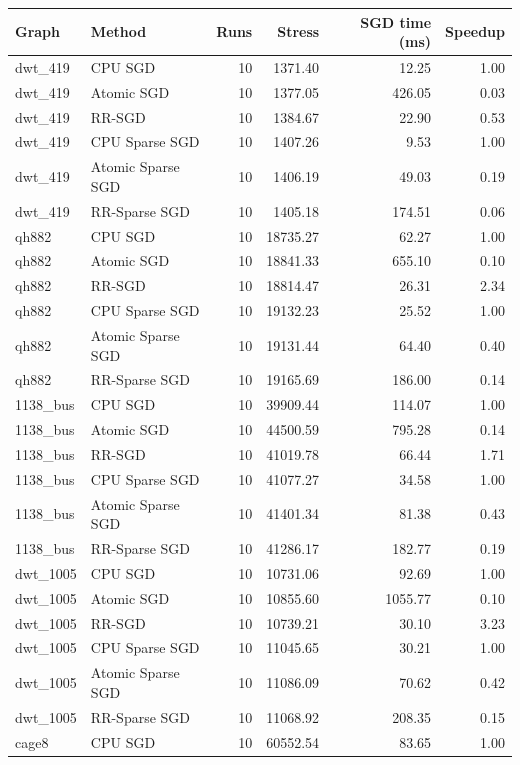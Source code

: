 \begin{tabular}{llrrrr}
\hline
Graph & Method & Runs & Stress & SGD time (ms) & Speedup \\
\hline
dwt\_419 & CPU SGD & 10 & 1371.40 & 12.25 & 1.00 \\
dwt\_419 & Atomic SGD & 10 & 1377.05 & 426.05 & 0.03 \\
dwt\_419 & RR-SGD & 10 & 1384.67 & 22.90 & 0.53 \\
dwt\_419 & CPU Sparse SGD & 10 & 1407.26 & 9.53 & 1.00 \\
dwt\_419 & Atomic Sparse SGD & 10 & 1406.19 & 49.03 & 0.19 \\
dwt\_419 & RR-Sparse SGD & 10 & 1405.18 & 174.51 & 0.06 \\
qh882 & CPU SGD & 10 & 18735.27 & 62.27 & 1.00 \\
qh882 & Atomic SGD & 10 & 18841.33 & 655.10 & 0.10 \\
qh882 & RR-SGD & 10 & 18814.47 & 26.31 & 2.34 \\
qh882 & CPU Sparse SGD & 10 & 19132.23 & 25.52 & 1.00 \\
qh882 & Atomic Sparse SGD & 10 & 19131.44 & 64.40 & 0.40 \\
qh882 & RR-Sparse SGD & 10 & 19165.69 & 186.00 & 0.14 \\
1138\_bus & CPU SGD & 10 & 39909.44 & 114.07 & 1.00 \\
1138\_bus & Atomic SGD & 10 & 44500.59 & 795.28 & 0.14 \\
1138\_bus & RR-SGD & 10 & 41019.78 & 66.44 & 1.71 \\
1138\_bus & CPU Sparse SGD & 10 & 41077.27 & 34.58 & 1.00 \\
1138\_bus & Atomic Sparse SGD & 10 & 41401.34 & 81.38 & 0.43 \\
1138\_bus & RR-Sparse SGD & 10 & 41286.17 & 182.77 & 0.19 \\
dwt\_1005 & CPU SGD & 10 & 10731.06 & 92.69 & 1.00 \\
dwt\_1005 & Atomic SGD & 10 & 10855.60 & 1055.77 & 0.10 \\
dwt\_1005 & RR-SGD & 10 & 10739.21 & 30.10 & 3.23 \\
dwt\_1005 & CPU Sparse SGD & 10 & 11045.65 & 30.21 & 1.00 \\
dwt\_1005 & Atomic Sparse SGD & 10 & 11086.09 & 70.62 & 0.42 \\
dwt\_1005 & RR-Sparse SGD & 10 & 11068.92 & 208.35 & 0.15 \\
cage8 & CPU SGD & 10 & 60552.54 & 83.65 & 1.00 \\

\end{tabular}
